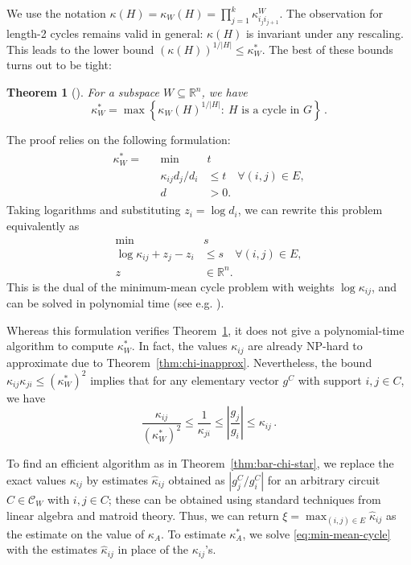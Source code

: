 \documentclass[11pt, a4paper]{article}
\newcommand{\Le}{\kappa}
\newcommand{\circuits}{\mathcal{C}}
\newcommand{\1}{\mathbbm{1}}
\newtheorem{theorem}{Theorem}[section]
\theoremstyle{case}
\newcommand{\R}{\mathbb{R}}
\begin{document}
We use the notation $\Le(H)=\Le_W(H)=\prod_{j=1}^k \Le^W_{i_j
  i_{j+1}}$. The observation for length-2 cycles remains valid in general: $\Le(H)$ is invariant under any rescaling. This leads to the lower bound $(\Le(H))^{1/|H|}\le \kappa^*_W$. The
 best of these bounds turns out to be tight:
\begin{theorem}[\cite{DHNV20}]\label{thm:circuit-min-max}
For a subspace $W\subseteq \R^n$, we have
\[
\Le_W^* = \max\left\{\Le_W(H)^{1/|H|}:\ \mbox{$H$ is a cycle in $G$}\right\}\, .
\]
\end{theorem}
The proof relies on the following formulation:
\begin{align}\label{eq:min-mean-cycle-mult}
\begin{aligned}
    \Le^*_W=&&\min \; & t \\
            &&\Le_{ij}d_j/d_i & \leq t \quad \forall (i,j) \in E, \\
            &&d &> 0.
\end{aligned}
\end{align}
Taking logarithms and substituting $z_i=\log d_i$, we can rewrite this problem equivalently as
\begin{equation}\label{eq:min-mean-cycle}
\begin{aligned}
\min \; & s \\
\log \Le_{ij} + z_j - z_i & \leq s \quad \forall (i,j) \in E, \\
z &\in \R^n.
\end{aligned}
\end{equation}
This is the dual of the minimum-mean cycle problem with weights $\log\Le_{ij}$, and can be solved in polynomial time (see e.g. \cite[Theorem 5.8]{amo}).

Whereas this formulation verifies Theorem~\ref{thm:circuit-min-max}, it does not give a polynomial-time algorithm to compute $\Le^*_W$. In fact, the values $\Le_{ij}$ are already NP-hard to approximate due to Theorem~\ref{thm:chi-inapprox}. Nevertheless, the bound $\Le_{ij}\Le_{ji}\le(\Le^*_W)^2$ implies that for any elementary vector $g^C$ with support $i,j\in C$, we have 
\begin{equation}\label{eq:hat-sandwich}
\frac{\Le_{ij}}{(\Le^*_W)^2}\le \frac{1}{\Le_{ji}} \le \left|\frac{g_j}{g_i}\right|\le \Le_{ij}\, .
\end{equation}

To find an efficient algorithm as in Theorem~\ref{thm:bar-chi-star},
we  replace the exact values $\Le_{ij}$ by estimates $\hat\Le_{ij}$ obtained as $|g^C_j/g^C_i|$ for an arbitrary circuit $C\in\circuits_W$ with $i,j\in C$; these can be obtained using standard techniques from linear algebra and matroid theory. 
Thus, we can return $\xi=\max_{(i,j)\in E}\hat\Le_{ij}$ as the estimate on the value of $\Le_A$. To estimate $\kappa^*_A$, we solve \eqref{eq:min-mean-cycle} with the estimates $\hat\Le_{ij}$ in place of the $\Le_{ij}$'s. 
\end{document}
